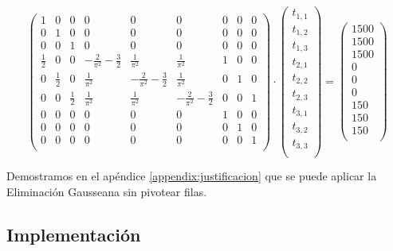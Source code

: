 \documentclass[12pt]{article}
\newcommand{\Gpmatrix}[1]{\ensuremath{\begin{pmatrix} #1 \end{pmatrix}}}
\newcommand{\sub}[3]{\ensuremath{#1_{#2,#3}}}
\begin{document}
\begin{equation}
\label{eq:example}
\Gpmatrix{
  1 & 0 & 0 & 0 & 0 & 0 & 0 & 0 & 0 \\
  0 & 1 & 0 & 0 & 0 & 0 & 0 & 0 & 0 \\
  0 & 0 & 1 & 0 & 0 & 0 & 0 & 0 & 0 \\
  \frac{1}{2} & 0 & 0 & -\frac{2}{\pi^2} - \frac{3}{2} & \frac{1}{\pi^2} & \frac{1}{\pi^2} & 1 & 0 & 0 \\
  0 & \frac{1}{2} & 0 & \frac{1}{\pi^2} & -\frac{2}{\pi^2} - \frac{3}{2} & \frac{1}{\pi^2} & 0 & 1 & 0 \\
  0 & 0 & \frac{1}{2} & \frac{1}{\pi^2} & \frac{1}{\pi^2} & -\frac{2}{\pi^2} - \frac{3}{2} & 0 & 0 & 1 \\
  0 & 0 & 0 & 0 & 0 & 0 & 1 & 0 & 0 \\
  0 & 0 & 0 & 0 & 0 & 0 & 0 & 1 & 0 \\
  0 & 0 & 0 & 0 & 0 & 0 & 0 & 0 & 1 \\
} \cdot \Gpmatrix{
  \sub{t}{1}{1} \\
  \sub{t}{1}{2} \\
  \sub{t}{1}{3} \\
  \sub{t}{2}{1} \\
  \sub{t}{2}{2} \\
  \sub{t}{2}{3} \\
  \sub{t}{3}{1} \\
  \sub{t}{3}{2} \\
  \sub{t}{3}{3} \\
} = \Gpmatrix{
  1500 \\
  1500 \\
  1500 \\
  0 \\
  0 \\
  0 \\
  150 \\
  150 \\
  150 \\
}
\end{equation}

Demostramos en el apéndice \ref{appendix:justificacion} que se puede aplicar la Eliminación Gausseana sin pivotear filas.

\subsection{Implementación}
\end{document}
